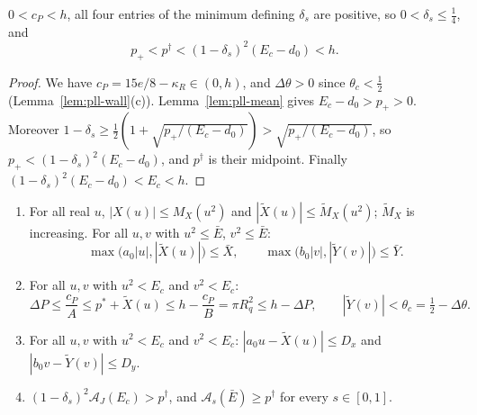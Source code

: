 \begin{lemma}\label{lem:pll-source-order}
$0<c_P<h$, all four entries of the minimum defining $\delta_s$ are positive, so $0<\delta_s\le\frac14$, and
\[
 p_+<p^\dagger<(1-\delta_s)^2(E_c-d_0)<h .
\]
\end{lemma}

\begin{proof}
We have $c_P=15e/8-\kappa_R\in(0,h)$, and $\Delta\theta>0$ since $\theta_c<\frac12$ (Lemma~\ref{lem:pll-wall}(c)). Lemma~\ref{lem:pll-mean} gives $E_c-d_0>p_+>0$. Moreover $1-\delta_s\ge\frac12(1+\sqrt{p_+/(E_c-d_0)})>\sqrt{p_+/(E_c-d_0)}$, so $p_+<(1-\delta_s)^2(E_c-d_0)$, and $p^\dagger$ is their midpoint. Finally $(1-\delta_s)^2(E_c-d_0)<E_c<h$.
\end{proof}

\begin{lemma}\label{lem:pll-bounds}
\begin{enumerate}[label=(\alph*)]
\item For all real $u$, $|X(u)|\le M_X(u^2)$ and $|\tilde X(u)|\le\tilde M_X(u^2)$; $\tilde M_X$ is increasing. For all
 $u,v$ with $u^2\le\bar E$, $v^2\le\bar E$:
 \[
  \max\bigl(a_0|u|,|\tilde X(u)|\bigr)\le\bar X,\qquad \max\bigl(b_0|v|,|\tilde Y(v)|\bigr)\le\bar Y .
 \]
\item For all $u,v$ with $u^2<E_c$ and $v^2<E_c$:
 \[
  \Delta P\le\frac{c_P}A\le p^*+\tilde X(u)\le h-\frac{c_P}B=\pi R_q^2\le h-\Delta P,\qquad
  |\tilde Y(v)|<\theta_c=\tfrac12-\Delta\theta .
 \]
\item For all $u,v$ with $u^2<E_c$ and $v^2<E_c$: $|a_0u-\tilde X(u)|\le D_x$ and $|b_0v-\tilde Y(v)|\le D_y$.
\item $(1-\delta_s)^2\mathcal A_J(E_c)>p^\dagger$, and $\mathcal A_s(\bar E)\ge p^\dagger$ for every $s\in[0,1]$.
\end{enumerate}
\end{lemma}

